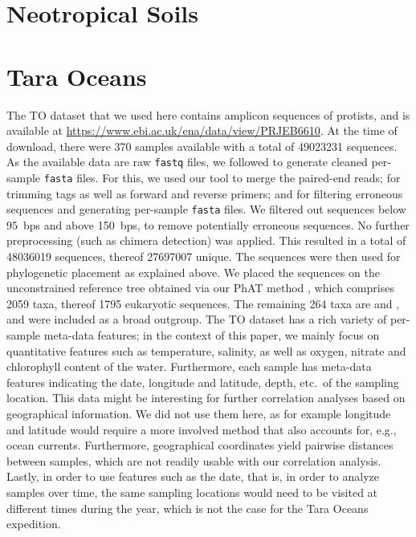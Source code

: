 \section{Neotropical Soils}
\label{supp:sec:DetailsEmpiricalDatasets:sub:NTS}

\section{Tara Oceans}
\label{supp:sec:DetailsEmpiricalDatasets:sub:Tara}

The \acf{TO} dataset \cite{Karsenti2011,Sunagawa2015,Guidi2016}
that we used here contains amplicon sequences of protists,
and is available at \url{https://www.ebi.ac.uk/ena/data/view/PRJEB6610}.
At the time of download, there were \num{370} samples available
with a total of \num{49 023 231} sequences.
As the available data are raw \texttt{fastq} files,
we followed \cite{FredsMetabarcodingPipeline} to generate cleaned per-sample \texttt{fasta} files.
For this, we used our tool  \cite{Zhang2014} to merge the paired-end reads;
 \cite{Martin2011} for trimming tags as well as forward and reverse primers;
and  \cite{Rognes2016} for filtering erroneous sequences and
generating per-sample \texttt{fasta} files.
We filtered out sequences below \SI{95}{bps} and above \SI{150}{bps}, to remove potentially erroneous sequences.
No further preprocessing (such as chimera detection) was applied.
This resulted in a total of \num{48 036 019} sequences, thereof \num{27 697 007} unique.
The sequences were then used for phylogenetic placement as explained above.
We placed the sequences on the unconstrained  reference tree obtained via our \ac{PhAT} method \cite{Czech2018},
which comprises \num{2 059} taxa, thereof \num{1 795} eukaryotic sequences.
The remaining \num{264} taxa are  and ,
and were included as a broad outgroup.
The \ac{TO} dataset has a rich variety of per-sample meta-data features;
in the context of this paper, we mainly focus on quantitative features such as
temperature, salinity, as well as oxygen, nitrate and chlorophyll content of the water.
Furthermore, each sample has meta-data features indicating the date, longitude and latitude, depth, etc.~of the sampling location.
This data might be interesting for further correlation analyses based on geographical information.
We did not use them here, as for example longitude and latitude would require a more involved method
that also accounts for, e.g., ocean currents.
Furthermore, geographical coordinates yield pairwise distances between samples,
which are not readily usable with our correlation analysis.
Lastly, in order to use features such as the date, that is, in order to analyze samples over time,
the same sampling locations would need to be visited at different times during the year,
which is not the case for the Tara Oceans expedition.

